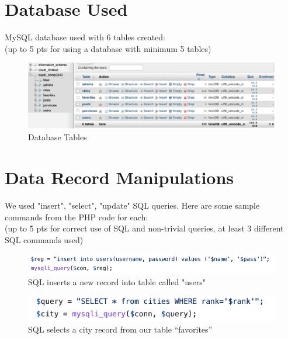 \documentclass[12pt, letterpaper]{article}
\begin{document}
\section{Database Used}
MySQL database used with 6 tables created:
\\(up to 5 pts for using a database with minimum 5 tables)

\begin{figure}[htbp]
	\centering
	\includegraphics[width=6in]{images/q15.png}
	\caption{Database Tables}
 \end{figure}

 \newpage

\section{Data Record Manipulations}
We used "insert", "select", "update" SQL queries. 
Here are some sample commands from the PHP code for each:
\\(up to 5 pts for correct use of SQL and non-trivial queries, at least 3 different SQL commands used)

\begin{figure}[htbp]
	\centering
	\includegraphics[width=6in]{images/q16-1.png}
	\caption{SQL inserts a new record into table called "users" }
 \end{figure}
 
 \begin{figure}[htbp]
	\centering
	\includegraphics[width=6in]{images/q16-2.png}
	\caption{SQL selects a city record from our table “favorites” }
 \end{figure}
 
\end{document}
